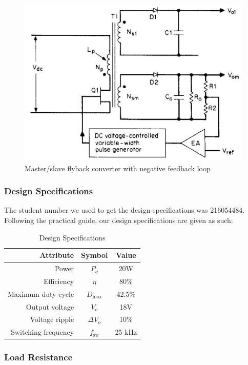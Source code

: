 \documentclass[a4paper, 12pt]{article}
\begin{document}
\begin{figure}[H]
  \centering
  \includegraphics[width=.6\textwidth]{./images/pressman_circuit.png}
  \caption{Master/slave flyback converter with negative feedback loop \cite{pressman}}
  \label{fig:pressman_circuit}
\end{figure}

\noindent 

\subsubsection{Design Specifications}

The student number we used to get the design specifications was 216054484.
Following the practical guide, our design specifications are given as such:

\begin{table}[H]
  \centering
  \begin{tabular}{r c c}
    \toprule
    \textbf{Attribute} & \textbf{Symbol} & \textbf{Value} \\
    \midrule
    Power & $P_o$ & 20W \\
    Efficiency & $\eta$ & 80\% \\
    Maximum duty cycle & $D_{\text{max}}$ & 42.5\% \\
    Output voltage & $V_o$ & 18V \\
    Voltage ripple & $\Delta V_o$ & 10\% \\
    Switching frequency & $f_{\text{sw}}$ & 25 kHz \\
    \bottomrule
  \end{tabular}
  \caption{Design Specifications}
  \label{tab:design_specs}
\end{table}

\subsubsection{Load Resistance}
\end{document}
